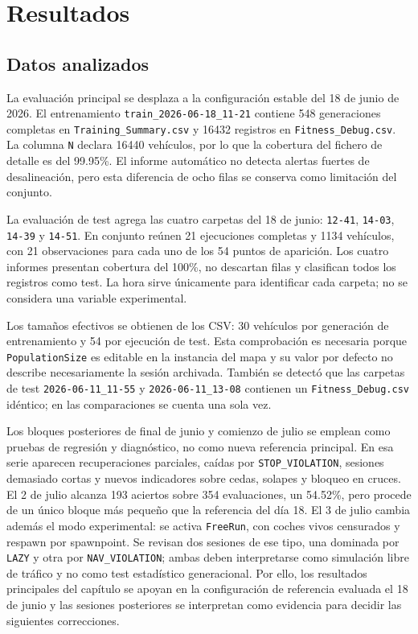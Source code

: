 \chapter{Resultados}

\section{Datos analizados}

La evaluación principal se desplaza a la configuración estable del 18 de junio de 2026. El entrenamiento \texttt{train\_2026-06-18\_11-21} contiene 548 generaciones completas en \texttt{Training\_Summary.csv} y 16432 registros en \texttt{Fitness\_Debug.csv}. La columna \texttt{N} declara 16440 vehículos, por lo que la cobertura del fichero de detalle es del 99.95\%. El informe automático no detecta alertas fuertes de desalineación, pero esta diferencia de ocho filas se conserva como limitación del conjunto.

La evaluación de test agrega las cuatro carpetas del 18 de junio: \texttt{12-41}, \texttt{14-03}, \texttt{14-39} y \texttt{14-51}. En conjunto reúnen 21 ejecuciones completas y 1134 vehículos, con 21 observaciones para cada uno de los 54 puntos de aparición. Los cuatro informes presentan cobertura del 100\%, no descartan filas y clasifican todos los registros como test. La hora sirve únicamente para identificar cada carpeta; no se considera una variable experimental.

Los tamaños efectivos se obtienen de los CSV\@: 30 vehículos por generación de entrenamiento y 54 por ejecución de test. Esta comprobación es necesaria porque \texttt{PopulationSize} es editable en la instancia del mapa y su valor por defecto no describe necesariamente la sesión archivada. También se detectó que las carpetas de test \texttt{2026-06-11\_11-55} y \texttt{2026-06-11\_13-08} contienen un \texttt{Fitness\_Debug.csv} idéntico; en las comparaciones se cuenta una sola vez.

Los bloques posteriores de final de junio y comienzo de julio se emplean como pruebas de regresión y diagnóstico, no como nueva referencia principal. En esa serie aparecen recuperaciones parciales, caídas por \texttt{STOP\_VIOLATION}, sesiones demasiado cortas y nuevos indicadores sobre cedas, solapes y bloqueo en cruces. El 2 de julio alcanza 193 aciertos sobre 354 evaluaciones, un 54.52\%, pero procede de un único bloque más pequeño que la referencia del día 18. El 3 de julio cambia además el modo experimental: se activa \texttt{FreeRun}, con coches vivos censurados y respawn por spawnpoint. Se revisan dos sesiones de ese tipo, una dominada por \texttt{LAZY} y otra por \texttt{NAV\_VIOLATION}; ambas deben interpretarse como simulación libre de tráfico y no como test estadístico generacional. Por ello, los resultados principales del capítulo se apoyan en la configuración de referencia evaluada el 18 de junio y las sesiones posteriores se interpretan como evidencia para decidir las siguientes correcciones.


